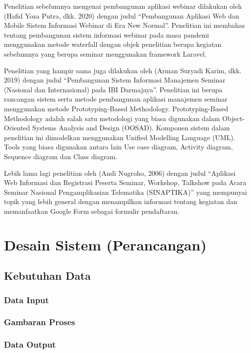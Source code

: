 Penelitian sebelumnya mengenai pembangunan aplikasi webinar dilakukan oleh (Hafid Yoza Putra, dkk. 2020) dengan judul “Pembangunan Aplikasi Web dan Mobile Sistem Informasi Webinar di Era New Normal”. Penelitian ini membahas tentang pembangunan sistem informasi webinar pada masa pandemi menggunakan metode waterfall dengan objek penelitian berupa kegiatan sebelumnya yang berupa seminar menggunakan framework Laravel.

Penelitian yang hampir sama juga dilakukan oleh (Arman Suryadi Karim, dkk. 2019) dengan judul “Pembangunan Sistem Informasi Manajemen Seminar (Nasional dan Internasional) pada IBI Darmajaya”. Penelitian ini berupa rancangan sistem serta metode pembangunan aplikasi manajemen seminar menggunakan metode Prototyping-Based Methodology. Prototyping-Based Methodology adalah salah satu metodologi yang biasa digunakan dalam Object-Oriented Systems Analysis and Design (OOSAD). Komponen sistem dalam penelitian ini dimodelkan menggunakan Unified Modelling Language (UML). Tools yang biasa digunakan antara lain Use case diagram, Activity diagram, Sequence diagram dan Class diagram.

Lebih lama lagi penelitian oleh (Andi Nugroho, 2006) dengan judul “Aplikasi Web Informasi dan Registrasi Peserta Seminar, Workshop, Talkshow pada Acara Seminar Nasional Pengamplikasian Telematika (SINAPTIKA)” yang mempunyai topik yang lebih general dengan menampilkan informasi tentang kegiatan dan memanfaatkan Google Form sebagai formulir pendaftaran.


\section{Desain Sistem (Perancangan)}

\subsection{Kebutuhan Data}
\subsubsection{Data Input}
\subsubsection{Gambaran Proses}
\subsubsection{Data Output}

